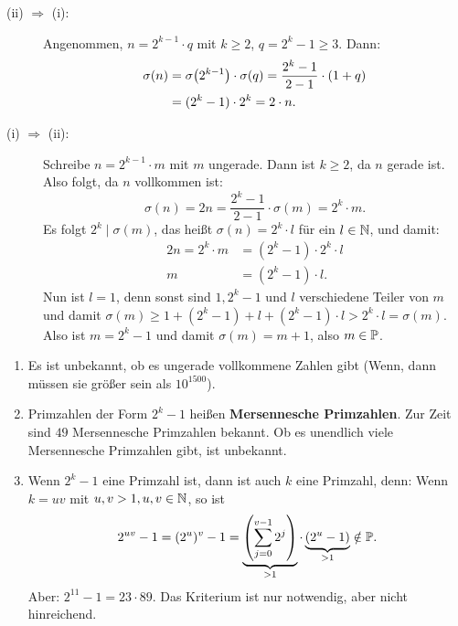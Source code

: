 	\begin{beweis}
		\begin{description}
			\item[(ii) $\Rightarrow$ (i):] Angenommen, $n = 2^{k-1} \cdot q$ mit $k \geq 2$, $q = 2^k-1 \geq 3$. 
			Dann:
			\begin{align*}
				\sigma(n) &= \sigma \enb{2^{k-1}} \cdot \sigma(q) = \frac{2^k-1}{2-1} \cdot (1+q) \\
				&= (2^k-1) \cdot 2^k = 2 \cdot n.
			\end{align*}  
			\item[(i) $\Rightarrow$ (ii):] Schreibe $n = 2^{k-1} \cdot m$ mit $m$ ungerade.
			Dann ist $k \geq 2$, da $n$ gerade ist.
			Also folgt, da $n$ vollkommen ist:
			\[
				\sigma(n) = 2n = \frac{2^k-1}{2-1} \cdot \sigma(m) = 2^k \cdot m.
			\] 
			Es folgt $2^k \mid \sigma(m)$, das heißt $\sigma(n) = 2^k \cdot l$ für ein $l \in \mathbb{N}$, und damit:
			\begin{align*}
				2n = 2^k \cdot m &= (2^k - 1) \cdot 2^k \cdot l \\
				m &= (2^k - 1) \cdot l.
			\end{align*}
			Nun ist $l=1$, denn sonst sind $1, 2^k-1$ und $l$ verschiedene Teiler von $m$ und damit $\sigma(m) \geq 1+(2^k-1)+l+(2^k-1)\cdot l > 2^k \cdot l = \sigma(m)$.
			Also ist $m = 2^k-1$ und damit $\sigma(m) = m+1$, also $m \in \mathbb{P}$.
		\end{description}
	\end{beweis}

	\begin{bemerkung}
		\begin{enumerate}[(1)]
			\item Es ist unbekannt, ob es ungerade vollkommene Zahlen gibt (Wenn, dann müssen sie größer sein als $10^{1500}$). \marginnote{[16]}
			\item Primzahlen der Form $2^k-1$ heißen \textbf{Mersennesche Primzahlen}. 
			Zur Zeit sind $49$ Mersennesche Primzahlen bekannt.
			Ob es unendlich viele Mersennesche Primzahlen gibt, ist unbekannt.
			\item Wenn $2^k-1$ eine Primzahl ist, dann ist auch $k$ eine Primzahl, denn:
			Wenn $k = uv$ mit $u,v > 1, u,v \in \mathbb{N}$, so ist
			\[
				2^{uv} - 1 = (2^u)^v - 1 = \underbrace{\left(\sum\limits_{j=0}^{v-1} 2^j\right)}_{>1} \cdot \underbrace{(2^u-1)}_{>1} \notin \mathbb{P}.
			\]
			Aber: $2^{11} - 1 = 23 \cdot 89$.
			Das Kriterium ist nur notwendig, aber nicht hinreichend.
		\end{enumerate}
	\end{bemerkung}

